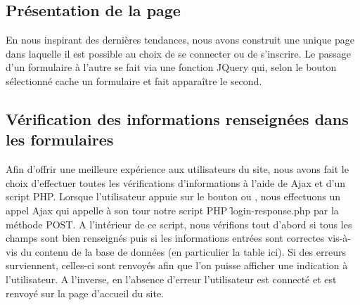         \bigskip

        \bigskip
        \subsection*{Présentation de la page}

            En nous inspirant des dernières tendances, nous avons construit une unique page dans laquelle il est possible au choix de se connecter ou de s'inscrire. Le passage d'un formulaire à l'autre se fait via une fonction JQuery qui, selon le bouton sélectionné cache un formulaire et fait apparaître le second.


        \bigskip
        \subsection*{Vérification des informations renseignées dans les formulaires}

            Afin d'offrir une meilleure expérience aux utilisateurs du site, nous avons fait le choix d'effectuer toutes les vérifications d'informations à l'aide de Ajax et d'un script PHP. Lorsque l'utilisateur appuie sur le bouton  ou , nous effectuons un appel Ajax qui appelle à son tour notre script PHP \f{login-response.php} par la méthode POST. A l'intérieur de ce script, nous vérifions tout d'abord si tous les champs sont bien renseignés puis si les informations entrées sont correctes vis-à-vis du contenu de la base de données (en particulier la table  ici). Si des erreurs surviennent, celles-ci sont renvoyés afin que l'on puisse afficher une indication à l'utilisateur. A l'inverse, en l'absence d'erreur l'utilisateur est connecté et est renvoyé sur la page d'accueil du site. 

